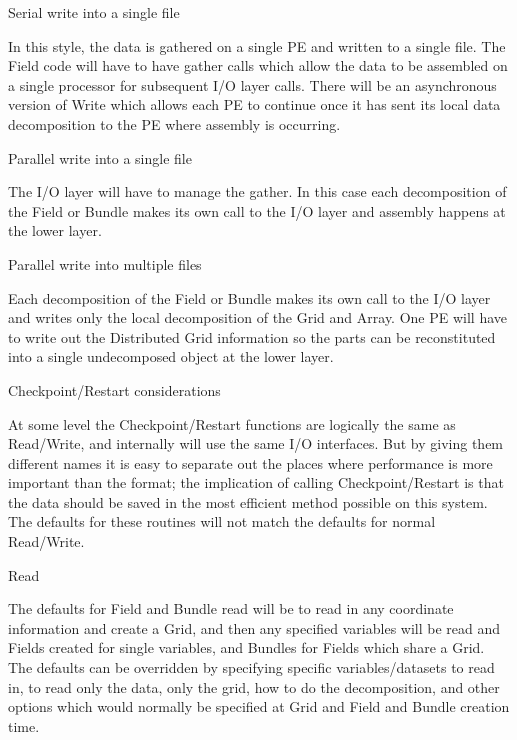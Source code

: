 \begin{description}
\begin{description}

\item{Serial write into a single file}

In this style, the data is gathered on a single PE
and written to a single file.  The Field code will have
to have gather calls which allow the data to be assembled
on a single processor for subsequent I/O layer calls.
There will be an asynchronous version of Write which
allows each PE to continue once it has sent its local
data decomposition to the PE where assembly is occurring.

\item{Parallel write into a single file}

The I/O layer will have to manage the gather.  In this
case each decomposition of the Field or Bundle makes
its own call to the I/O layer and assembly happens at
the lower layer.

\item{Parallel write into multiple files}

Each decomposition of the Field or Bundle makes its own
call to the I/O layer and writes only the local decomposition
of the Grid and Array.  One PE will have to
write out the Distributed Grid information so the parts can
be reconstituted into a single undecomposed object at 
the lower layer.

\item{Checkpoint/Restart considerations}

At some level the Checkpoint/Restart functions are
logically the same as Read/Write, and internally will use the
same I/O interfaces.  But by giving them different
names it is easy to separate out the places where performance
is more important than the format; the implication of calling
Checkpoint/Restart is that the data should be saved in the
most efficient method possible on this system.
The defaults for these routines will not match the defaults
for normal Read/Write.

\end{description}


\item{Read}

The defaults for Field and Bundle read will be to read
in any coordinate information and create a Grid, and then
any specified variables will be read and Fields created
for single variables, and Bundles for Fields which share
a Grid.  The defaults can be overridden by specifying
specific variables/datasets to read in, to read only the
data, only the grid, how to do the decomposition, and
other options which would normally be specified at 
Grid and Field and Bundle creation time.


\end{description}
